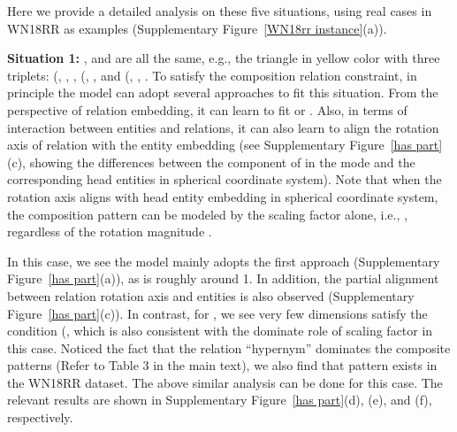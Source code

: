 \documentclass[11pt]{article}
\begin{document}
Here we provide a detailed analysis on these five situations, using real cases in WN18RR as examples (Supplementary Figure~\ref{WN18rr instance}(a)).

\textbf{Situation 1:} ,  and  are all the same, e.g., the triangle in yellow color with three triplets: (, , , (, ,  and (, , . To satisfy the composition relation constraint, in principle the model can adopt several approaches to fit this situation. From the perspective of relation embedding, it can learn to fit  or . Also, in terms of interaction between entities and relations, it can also learn to align the rotation axis of relation with the entity embedding (see Supplementary Figure~\ref{has part}(c), showing the differences between the  component of  in the mode  and the corresponding head entities  in spherical coordinate system). Note that when the rotation axis aligns with head entity embedding in spherical coordinate system, the composition pattern can be modeled by the scaling factor alone, i.e., , regardless of the rotation magnitude . 

In this case, we see the model mainly adopts the first approach (Supplementary Figure~\ref{has part}(a)), as  is roughly around 1. In addition, the partial alignment between relation rotation axis and entities is also observed (Supplementary Figure~\ref{has part}(c)). In contrast, for , we see very few dimensions satisfy the condition (, which is also consistent with the dominate role of scaling factor in this case. Noticed the fact that the relation ``hypernym'' dominates the composite patterns (Refer to Table 3 in the main text), we also find that  pattern exists in the WN18RR dataset. The above similar analysis can be done for this case. The relevant results are shown in Supplementary Figure~\ref{has part}(d), (e), and (f), respectively.
\end{document}
